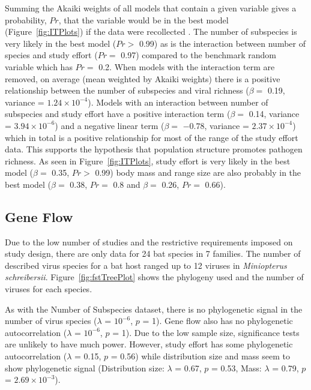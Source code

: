 Summing the Akaiki weights of all models that contain a given variable gives a probability, $Pr$, that the variable would be in the best model (Figure~\ref{fig:ITPlots}) if the data were recollected \cite{whittingham2006we}.
The number of subspecies is very likely in the best model ($Pr > $ 0.99) as is the interaction between number of species and study effort ($Pr = $ 0.97) compared to the benchmark random variable which has $Pr = $ 0.2.
When models with the interaction term are removed, on average (mean weighted by Akaiki weights) there is a positive relationship between the number of subspecies and viral richness ($\beta = $ 0.19, variance = \ensuremath{1.24\times 10^{-4}}).
Models with an interaction between number of subspecies and study effort have a positive interaction term ($\beta = $ 0.14, variance = \ensuremath{3.94\times 10^{-6}}) and a negative linear term ($\beta = $ \ensuremath{-0.78}, variance = \ensuremath{2.37\times 10^{-4}}) which in total is a positive relationship for most of the range of the study effort data.
This supports the hypothesis that population structure promotes pathogen richness.
As seen in Figure~\ref{fig:ITPlots}, study effort is very likely in the best model ($\beta = $ 0.35, $Pr > $ 0.99) body mass and range size are also probably in the best model ($\beta = $ 0.38, $Pr = $ 0.8 and $\beta = $ 0.26, $Pr = $ 0.66).



\subsection{Gene Flow}

Due to the low number of studies and the restrictive requirements imposed on study design, there are only data for 24 bat species in 7 families.
The number of described virus species for a bat host ranged up to 12 viruses in \emph{Miniopterus schreibersii}.
Figure~\ref{fig:fstTreePlot} shows the phylogeny used and the number of viruses for each species.


As with the Number of Subspecies dataset, there is no phylogenetic signal in the number of virus species ($\lambda$ = \ensuremath{10^{-6}}, $p$ = 1). 
Gene flow also has no phylogenetic autocorrelation ($\lambda$ = \ensuremath{10^{-6}}, $p$ = 1).
Due to the low sample size, significance tests are unlikely to have much power.
However, study effort has some phylogenetic autocorrelation ($\lambda$ = 0.15, $p$ = 0.56) while distribution size and mass seem to show phylogenetic signal (Distribution size: $\lambda$ = 0.67, $p$ = 0.53, Mass: $\lambda$ = 0.79, $p$ = \ensuremath{2.69\times 10^{-3}}).


